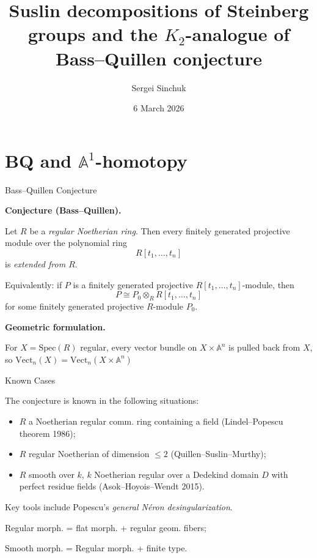 \documentclass[handout]{beamer} %
\title{Suslin decompositions of Steinberg groups and the $K_2$-analogue of Bass--Quillen conjecture}
\author{Sergei Sinchuk}
\date{6 March 2026}
\theoremstyle{definition}
\begin{document}
\begin{frame}
\titlepage
\end{frame}

\section{BQ and $\mathbb{A}^1$-homotopy}

\begin{frame} \tableofcontents[currentsection] \end{frame}

\begin{frame}{Bass--Quillen Conjecture}

\textbf{Conjecture (Bass--Quillen).}

Let $R$ be a \emph{regular Noetherian ring}. Then every finitely generated projective module over the polynomial ring
\[R[t_1,\dots,t_n]\]
is \emph{extended from $R$}.
\pause

Equivalently: if $P$ is a finitely generated projective $R[t_1,\dots,t_n]$-module, then
\[P \cong P_0 \otimes_R R[t_1,\dots,t_n]\]
for some finitely generated projective $R$-module $P_0$.
\pause

\medskip

\textbf{Geometric formulation.}

For $X=\mathrm{Spec}(R)$ regular, every vector bundle on $X \times \mathbb{A}^n$ is pulled back from $X$, so $\mathrm{Vect}_n(X) = \mathrm{Vect}_n(X \times \mathbb{A}^n)$
\end{frame}

\begin{frame}{Known Cases}

The conjecture is known in the following situations:

\begin{itemize}
  \item $R$ a Noetherian regular comm. ring containing a field (Lindel--Popescu theorem 1986);
  \pause
  \item $R$ regular Noetherian of dimension $\leq 2$ (Quillen--Suslin--Murthy);
  \pause
  \item $R$ smooth over $k$, $k$ Noetherian regular over a Dedekind domain $D$ with perfect residue fields (Asok--Hoyois--Wendt 2015).
\end{itemize}
\pause
Key tools include Popescu's \emph{general N\'eron desingularization}.
\pause

Regular morph. = flat morph. + regular geom. fibers;
\pause

Smooth morph. = Regular morph. + finite type.

\end{frame}
\end{document}

